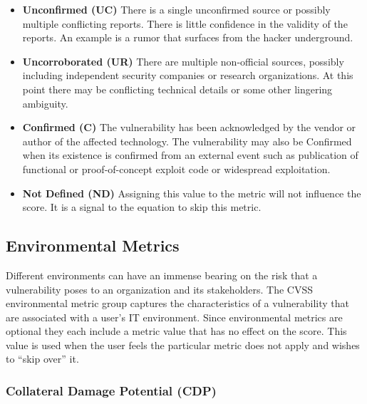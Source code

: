         \begin{itemize}
          \item
            \textbf{Unconfirmed (UC)} There is a single unconfirmed source or
            possibly multiple conflicting reports. There is little confidence in
            the validity of the reports. An example is a rumor that surfaces from
            the hacker underground.
          \item
            \textbf{Uncorroborated (UR)} There are multiple non-official sources,
            possibly including independent security companies or research
            organizations. At this point there may be conflicting technical
            details or some other lingering ambiguity.
          \item
            \textbf{Confirmed (C)} The vulnerability has been acknowledged by the
            vendor or author of the affected technology. The vulnerability may
            also be Confirmed when its existence is confirmed from an external
            event such as publication of functional or proof-of-concept exploit
            code or widespread exploitation.
          \item
            \textbf{Not Defined (ND)} Assigning this value to the metric will not
            influence the score. It is a signal to the equation to skip this
            metric.
        \end{itemize}

    \subsection{Environmental Metrics}\label{subsec:environmental-metrics}

      Different environments can have an immense bearing on the risk that a
      vulnerability poses to an organization and its stakeholders. The CVSS
      environmental metric group captures the characteristics of a
      vulnerability that are associated with a user's IT environment. Since
      environmental metrics are optional they each include a metric value that
      has no effect on the score. This value is used when the user feels the
      particular metric does not apply and wishes to ``skip over'' it.

      \subsubsection{Collateral Damage Potential (CDP)}\label{subsubsec:collateral-damage-potential-cdp}


